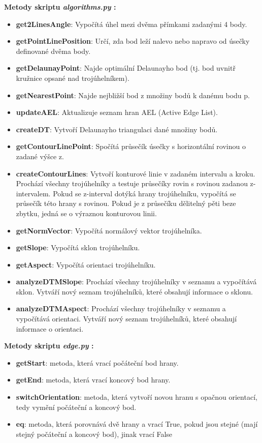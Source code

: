 \documentclass[a4paper,12pt]{article}
\begin{document}
{{{{{{{{{{{    \textbf{Metody skriptu \emph{algorithms.py} :}
    \begin{itemize}
    \item \textbf{get2LinesAngle}: Vypočítá úhel mezi dvěma přímkami zadanými 4 body.
    \item \textbf{getPointLinePosition}: Určí, zda bod leží nalevo nebo napravo od úsečky definované dvěma body.
    \item \textbf{getDelaunayPoint}: Najde optimální Delaunayho bod (tj. bod uvnitř kružnice opsané nad trojúhelníkem).
    \item \textbf{getNearestPoint}: Najde nejbližší bod z množiny bodů k danému bodu p.
    \item \textbf{updateAEL}: Aktualizuje seznam hran AEL (Active Edge List).
    \item \textbf{createDT}: Vytvoří Delaunayho triangulaci dané množiny bodů.
    \item \textbf{getContourLinePoint}: Spočítá průsečík úsečky s horizontální rovinou o zadané výšce z.
    \item \textbf{createContourLines}: Vytvoří konturové linie v zadaném intervalu a kroku. Prochází všechny trojúhelníky a testuje průsečíky rovin s rovinou zadanou z-intervalem. Pokud se z-interval dotýká hrany trojúhelníku, vypočítá se průsečík této hrany s rovinou. Pokud je z průsečíku dělitelný pěti beze zbytku, jedná se o výraznou konturovou linii.
    \item \textbf{getNormVector}: Vypočítá normálový vektor trojúhelníka.
    \item \textbf{getSlope}: Vypočítá sklon trojúhelníku.
    \item \textbf{getAspect}: Vypočítá orientaci trojúhelníku.
    \item \textbf{analyzeDTMSlope}: Prochází všechny trojúhelníky v seznamu a vypočítává sklon. Vytváří nový seznam trojúhelníků, které obsahují informace o sklonu.
    \item \textbf{analyzeDTMAspect}: Prochází všechny trojúhelníky v seznamu a vypočítává orientaci. Vytváří nový seznam trojúhelníků, které obsahují informace o orientaci.
    \end{itemize}

    \textbf{Metody skriptu \emph{edge.py} :}
    \begin{itemize}
    \item \textbf{getStart}: metoda, která vrací počáteční bod hrany.
    \item \textbf{getEnd}: metoda, která vrací koncový bod hrany.
    \item \textbf{switchOrientation}: metoda, která vytvoří novou hranu s opačnou orientací, tedy vymění počáteční a koncový bod.
    \item \textbf{eq}: metoda, která porovnává dvě hrany a vrací True, pokud jsou stejné (mají stejný počáteční a koncový bod), jinak vrací False
    \end{itemize}

}}}}}}}}}}}
\end{document}
